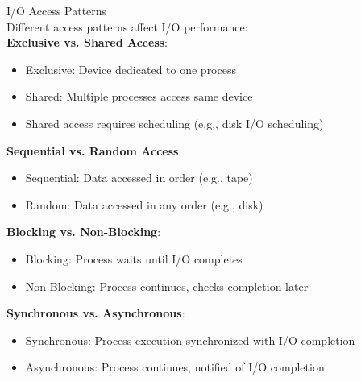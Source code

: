 \begin{definition}{I/O Access Patterns}\\
    Different access patterns affect I/O performance:\\
        \textbf{Exclusive vs. Shared Access}:
            \begin{itemize}
                \item Exclusive: Device dedicated to one process
                \item Shared: Multiple processes access same device
                \item Shared access requires scheduling (e.g., disk I/O scheduling)
            \end{itemize}
        \textbf{Sequential vs. Random Access}:
            \begin{itemize}
                \item Sequential: Data accessed in order (e.g., tape)
                \item Random: Data accessed in any order (e.g., disk)
            \end{itemize}
        \textbf{Blocking vs. Non-Blocking}:
            \begin{itemize}
                \item Blocking: Process waits until I/O completes
                \item Non-Blocking: Process continues, checks completion later
            \end{itemize}
        \textbf{Synchronous vs. Asynchronous}:
            \begin{itemize}
                \item Synchronous: Process execution synchronized with I/O completion
                \item Asynchronous: Process continues, notified of I/O completion
            \end{itemize}
\end{definition}

